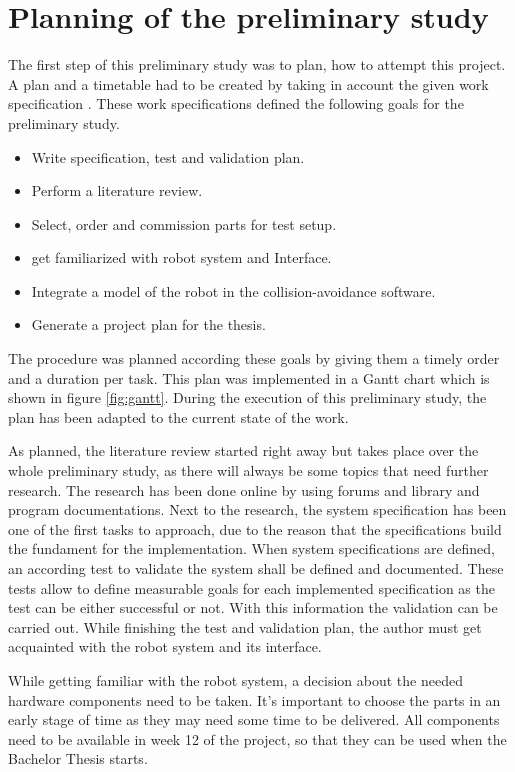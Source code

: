 \chapter{Planning of the preliminary study}
\label{chap:Planning}
The first step of this preliminary study was to plan, how to attempt this project. A plan and a timetable had to be created by taking in account the given work specification \cite{work_desc}. These work specifications defined the following goals for the preliminary study.
\begin{itemize}
	\item Write specification, test and validation plan.
	\item Perform a literature review.
	\item Select, order and commission parts for test setup.
	\item get familiarized with robot system and Interface.
	\item Integrate a model of the robot in the collision-avoidance software.
	\item Generate a project plan for the thesis.
\end{itemize}

The procedure was planned according these goals by giving them a timely order and a duration per task. This plan was implemented in a Gantt chart which is shown in figure \ref{fig:gantt}.
During the execution of this preliminary study, the plan has been adapted to the current state of the work.

As planned, the literature review started right away but takes place over the whole preliminary study, as there will always be some topics that need further research. The research has been done online by using forums and library and program documentations.
Next to the research, the system specification has been one of the first tasks to approach, due to the reason that the specifications build the fundament for the implementation. When system specifications are defined, an according test to validate the system shall be defined and documented. These tests allow to define measurable goals for each implemented specification as the test can be either successful or not. With this information the validation can be carried out. While finishing the test and validation plan, the author must get acquainted with the robot system and its interface.


While getting familiar with the robot system, a decision about the needed hardware components need to be taken. It's important to choose the parts in an early stage of time as they may need some time to be delivered. All components need to be available in week 12 of the project, so that they can be used when the Bachelor Thesis starts.



